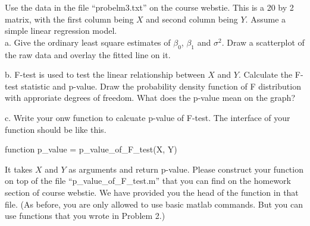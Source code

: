 \documentclass[12pt]{article}
\begin{document}
 {
  Use the data in the file ``probelm3.txt'' on the course webstie. This is a 20 by 2 matrix, with the first column being $X$ and second column being $Y$. Assume a simple linear regression model.\\
 a. Give the ordinary least square estimates of $\beta_0$, $\beta_1$ and $\sigma^2$. Draw a scatterplot of the raw data and overlay the fitted line on it.

 b. F-test is used to test the linear relationship between $X$ and $Y$. Calculate the F-test statistic and p-value. Draw the probability density function of F distribution with approriate degrees of freedom. What does the p-value mean on the graph?

 c. Write your onw function to calcuate p-value of F-test. The interface of your function should be like this.

\begin{center}
function p\_value = p\_value\_of\_F\_test(X, Y)
\end{center}

It takes $X$ and $Y$ as arguments and return p-value. Please construct your function on top of the file ``p\_value\_of\_F\_test.m'' that you can find on the homework section of course webstie. We have provided you the head of the function in that file. (As before, you are only allowed to use basic matlab commands. But you can use functions that you wrote in Problem 2.)
}
 { \vfill
  \ANSWER
} {}




\problemsdone
\end{document}

